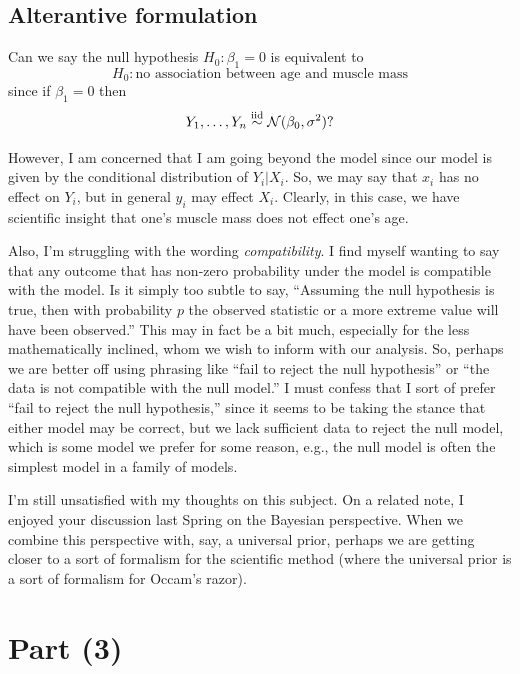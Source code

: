 \documentclass[
]{article}
\begin{document}
\hypertarget{alterantive-formulation}{%
\subsection{Alterantive formulation}\label{alterantive-formulation}}

Can we say the null hypothesis \(H_0 : \beta_1 = 0\) is equivalent to \[
  H_0 : \text{no association between age and muscle mass}
\] since if \(\beta_1 = 0\) then \[
  Y_1,\ldots,Y_n \overset{\rm{iid}}{\sim} \mathcal{N}(\beta_0,\sigma^2)?
\]

However, I am concerned that I am going beyond the model since our model
is given by the conditional distribution of \(Y_i|X_i\). So, we may say
that \(x_i\) has no effect on \(Y_i\), but in general \(y_i\) may effect
\(X_i\). Clearly, in this case, we have scientific insight that one's
muscle mass does not effect one's age.

Also, I'm struggling with the wording \emph{compatibility}. I find
myself wanting to say that any outcome that has non-zero probability
under the model is compatible with the model. Is it simply too subtle to
say, ``Assuming the null hypothesis is true, then with probability \(p\)
the observed statistic or a more extreme value will have been
observed.'' This may in fact be a bit much, especially for the less
mathematically inclined, whom we wish to inform with our analysis. So,
perhaps we are better off using phrasing like ``fail to reject the null
hypothesis'' or ``the data is not compatible with the null model.'' I
must confess that I sort of prefer ``fail to reject the null
hypothesis,'' since it seems to be taking the stance that either model
may be correct, but we lack sufficient data to reject the null model,
which is some model we prefer for some reason, e.g., the null model is
often the simplest model in a family of models.

I'm still unsatisfied with my thoughts on this subject. On a related
note, I enjoyed your discussion last Spring on the Bayesian perspective.
When we combine this perspective with, say, a universal prior, perhaps
we are getting closer to a sort of formalism for the scientific method
(where the universal prior is a sort of formalism for Occam's razor).

\hypertarget{part-3}{%
\section{Part (3)}\label{part-3}}
\end{document}
